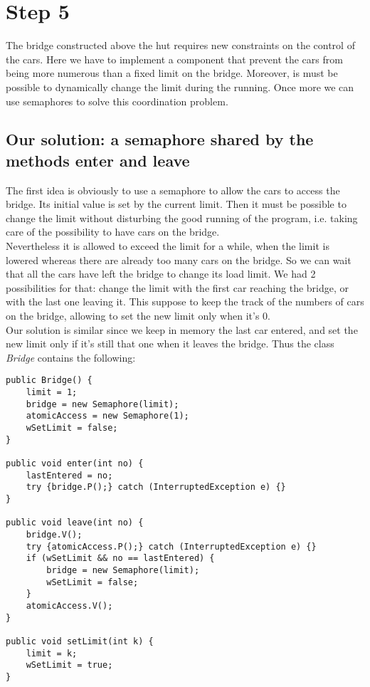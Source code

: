 
\section{Step 5}


The bridge constructed above the hut requires new constraints on the control of the cars. Here we have to implement a component that prevent the cars from being more numerous than a fixed limit on the bridge. Moreover, is must be possible to dynamically change the limit during the running. Once more we can use semaphores to solve this coordination problem.

\subsection{Our solution: a semaphore shared by the methods enter and leave}
The first idea is obviously to use a semaphore to allow the cars to access the bridge. Its initial value is set by the current limit. Then it must be possible to change the limit without disturbing the good running of the program, i.e. taking care of the possibility to have cars on the bridge.\\
Nevertheless it is allowed to exceed the limit for a while, when the limit is lowered whereas there are already too many cars on the bridge. So we can wait that all the cars have left the bridge to change its load limit. We had 2 possibilities for that: change the limit with the first car reaching the bridge, or with the last one leaving it. This suppose to keep the track of the numbers of cars on the bridge, allowing to set the new limit only when it's 0.\\
Our solution is similar since we keep in memory the last car entered, and set the new limit only if it's still that one when it leaves the bridge. Thus the class \textit{Bridge} contains the following:

\begin{verbatim}
public Bridge() {
	limit = 1;
	bridge = new Semaphore(limit);
	atomicAccess = new Semaphore(1);
	wSetLimit = false;
}

public void enter(int no) {
	lastEntered = no;
	try {bridge.P();} catch (InterruptedException e) {}
}

public void leave(int no) {
	bridge.V();
	try {atomicAccess.P();} catch (InterruptedException e) {}
	if (wSetLimit && no == lastEntered) {
		bridge = new Semaphore(limit);
		wSetLimit = false;
	}
	atomicAccess.V();
}

public void setLimit(int k) {
	limit = k;
	wSetLimit = true;
}
\end{verbatim}

